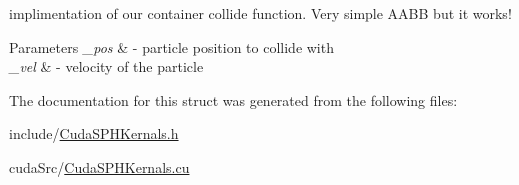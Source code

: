 implimentation of our container collide function. Very simple A\-A\-B\-B but it works! 


\begin{DoxyParams}{Parameters}
{\em \-\_\-pos} & -\/ particle position to collide with \\
\hline
{\em \-\_\-vel} & -\/ velocity of the particle \\
\hline
\end{DoxyParams}


The documentation for this struct was generated from the following files\-:\begin{DoxyCompactItemize}
\item 
include/\hyperlink{_cuda_s_p_h_kernals_8h}{Cuda\-S\-P\-H\-Kernals.\-h}\item 
cuda\-Src/\hyperlink{_cuda_s_p_h_kernals_8cu}{Cuda\-S\-P\-H\-Kernals.\-cu}\end{DoxyCompactItemize}
